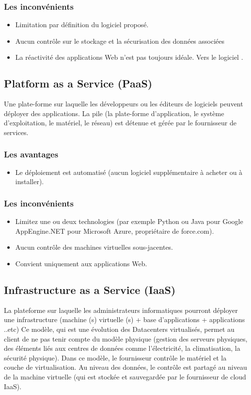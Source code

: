 \subsubsection{Les inconvénients}
\begin{itemize}
    \item Limitation par définition du logiciel proposé.
    \item Aucun contrôle sur le stockage et la sécurisation des données associées
    \item La réactivité des applications Web n'est pas toujours idéale. Vers le logiciel \cite{c5}.

\end{itemize}
\subsection{Platform as a Service (PaaS)}
Une plate-forme sur laquelle les développeurs ou les éditeurs de logiciels peuvent déployer des applications. La pile (la plate-forme d'application, le système d'exploitation, le matériel, le réseau) est détenue et gérée par le fournisseur de services.
\subsubsection{Les avantages}
\begin{itemize}
    \item Le déploiement est automatisé (aucun logiciel supplémentaire à acheter ou à installer).

\end{itemize}
\subsubsection{Les inconvénients}
\begin{itemize}
    \item Limitez une ou deux technologies (par exemple Python ou Java pour Google AppEngine.NET pour Microsoft Azure, propriétaire de force.com).
    \item Aucun contrôle des machines virtuelles sous-jacentes.
    \item Convient uniquement aux applications Web.
\end{itemize}
\subsection{Infrastructure as a Service (IaaS)}
La plateforme sur laquelle les administrateurs informatiques pourront déployer une infrastructure (machine (s) virtuelle (s) + base d'applications + applications ..etc) Ce modèle, qui est une évolution des Datacenters virtualisés, permet au client de ne pas tenir compte du modèle physique (gestion des serveurs physiques, des éléments liés aux centres de données comme l'électricité, la climatisation, la sécurité physique). Dans ce modèle, le fournisseur contrôle le matériel et la couche de virtualisation. Au niveau des données, le contrôle est partagé au niveau de la machine virtuelle (qui est stockée et sauvegardée par le fournisseur de cloud IaaS).
